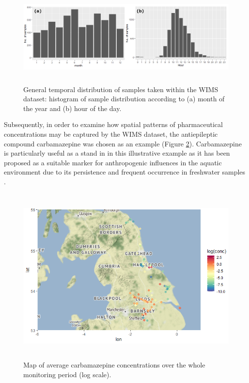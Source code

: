 \documentclass{article}
\begin{document}
\begin{figure}[h]
    \centering
    \includegraphics[height=5cm]{fig_hist.png}
    \caption{General temporal distribution of samples taken within the WIMS dataset: histogram of sample distribution according to (a) month of the year and (b) hour of the day.}
    \label{fig_general_hist}
\end{figure}

Subsequently, in order to examine how spatial patterns of pharmaceutical concentrations may be captured by the WIMS dataset, the antiepileptic compound carbamazepine was chosen as an example (Figure \ref{fig_carbamazepine_map}). Carbamazepine is particularly useful as a stand in in this illustrative example as it has been proposed as a suitable marker for anthropogenic influences in the aquatic environment due to its persistence and frequent occurrence in freshwater samples \citep{Clara2004CarbamazepineInfiltration}.

\begin{figure}[h]
    \centering
    \includegraphics[height=9cm]{fig_carbamazepine_map.png}
    \caption{Map of average carbamazepine concentrations over the whole monitoring period (log scale).}
    \label{fig_carbamazepine_map}
\end{figure}
\end{document}
